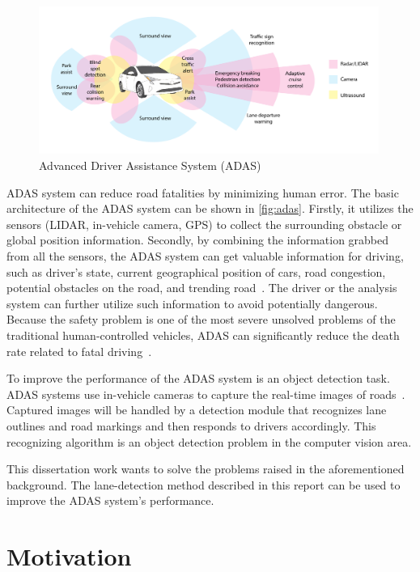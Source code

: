 \begin{spacing}{1.5}
\begin{figure}[ht]
\centering
\includegraphics[width=0.99\textwidth, fbox]{Chapter1/adas.pdf}
\caption{Advanced Driver Assistance System (ADAS)~\cite{adas}}
\label{fig:adas} 
\end{figure}

ADAS system can reduce road fatalities by minimizing human error. The basic architecture of the ADAS system can be shown in \autoref{fig:adas}. Firstly, it utilizes the sensors (LIDAR, in-vehicle camera, GPS) to collect the surrounding obstacle or global position information. Secondly, by combining the information grabbed from all the sensors, the ADAS system can get valuable information for driving, such as driver's state, current geographical position of cars, road congestion, potential obstacles on the road, and trending road~\cite{morignot2014arbitration}. The driver or the analysis system can further utilize such information to avoid potentially dangerous. Because the safety problem is one of the most severe unsolved problems of the traditional human-controlled vehicles, ADAS can significantly reduce the death rate related to fatal driving~\cite{brookhuis2001behavioural}.

To improve the performance of the ADAS system is an object detection task. ADAS systems use in-vehicle cameras to capture the real-time images of roads~\cite{ziebinski2016survey}. Captured images will be handled by a detection module that recognizes lane outlines and road markings and then responds to drivers accordingly. This recognizing algorithm is an object detection problem in the computer vision area. 

This dissertation work wants to solve the problems raised in the aforementioned background. The lane-detection method described in this report can be used to improve the ADAS system's performance. 

\section{Motivation}
\label{sec:IN_motivation}


\end{spacing}
